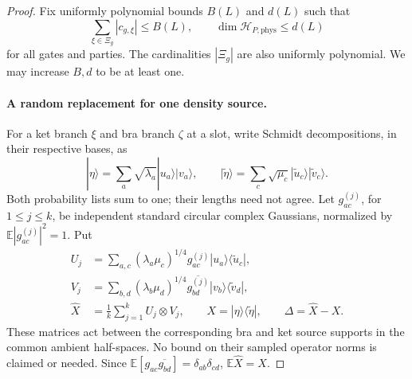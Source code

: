 \documentclass[11pt]{article}
\numberwithin{equation}{section}
\theoremstyle{definition}
\theoremstyle{remark}
\begin{document}
\begin{proof}
Fix uniformly polynomial bounds $B(L)$ and $d(L)$ such that
\begin{equation}
 \sum_{\xi\in\Xi_g}|c_{g,\xi}|\le B(L),
 \qquad
 \dim\mathcal H_{P,\mathrm{phys}}\le d(L)
 \label{eq:compression-polynomial-bounds}
\end{equation}
for all gates and parties.  The cardinalities $|\Xi_g|$ are also
uniformly polynomial.  We may increase $B,d$ to be at least one.

\paragraph{A random replacement for one density source.}
For a ket branch $\xi$ and bra branch $\zeta$ at a slot, write Schmidt
decompositions, in their respective bases, as
\[
 |\eta\rangle=\sum_a\sqrt{\lambda_a}
                      |u_a\rangle|v_a\rangle,
 \qquad
 |\widetilde\eta\rangle=\sum_c\sqrt{\mu_c}
                      |\widetilde u_c\rangle
                      |\widetilde v_c\rangle.
\]
Both probability lists sum to one; their lengths need not agree.  Let
$g_{ac}^{(j)}$, for $1\le j\le k$, be independent standard circular
complex Gaussians, normalized by $\mathbb E|g_{ac}^{(j)}|^2=1$.  Put
\begin{align}
 U_j&=\sum_{a,c}(\lambda_a\mu_c)^{1/4}g_{ac}^{(j)}
             |u_a\rangle\langle\widetilde u_c|,\nonumber\\
 V_j&=\sum_{b,d}(\lambda_b\mu_d)^{1/4}
                    \overline{g_{bd}^{(j)}}
             |v_b\rangle\langle\widetilde v_d|,\nonumber\\
 \widehat X&=\frac1k\sum_{j=1}^k U_j\otimes V_j,
 \qquad X=|\eta\rangle\langle\widetilde\eta|,
 \qquad \Delta=\widehat X-X.
 \label{eq:compression-random-source}
\end{align}
These matrices act between the corresponding bra and ket source
supports in the common ambient half-spaces.  No bound on their sampled
operator norms is claimed or needed.  Since
$\mathbb E[g_{ac}\overline{g_{bd}}]=\delta_{ab}\delta_{cd}$,
$\mathbb E\widehat X=X$.


\end{proof}
\end{document}
